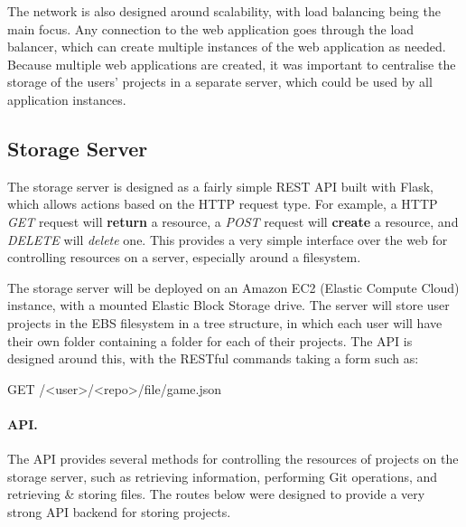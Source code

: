 	The network is also designed around scalability, with load balancing being the main focus. Any connection to the web application goes through the load balancer, which can create multiple instances of the web application as needed. Because multiple web applications are created, it was important to centralise the storage of the users' projects in a separate server, which could be used by all application instances.

	\subsection{Storage Server}
	\label{subsection:storageserverdesign}
	The storage server is designed as a fairly simple REST API built with Flask, which allows actions based on the HTTP request type. For example, a HTTP \emph{GET} request will \textbf{return} a resource, a \emph{POST} request will \textbf{create} a resource, and \emph{DELETE} will \emph{delete} one. This provides a very simple interface over the web for controlling resources on a server, especially around a filesystem.

	The storage server will be deployed on an Amazon EC2 (Elastic Compute Cloud) instance, with a mounted Elastic Block Storage drive. The server will store user projects in the EBS filesystem in a tree structure, in which each user will have their own folder containing a folder for each of their projects. The API is designed around this, with the RESTful commands taking a form such as:

	GET /<user>/<repo>/file/game.json

	\paragraph{API.}
	The API provides several methods for controlling the resources of projects on the storage server, such as retrieving information, performing Git operations, and retrieving \& storing files. The routes below were designed to provide a very strong API backend for storing projects.

